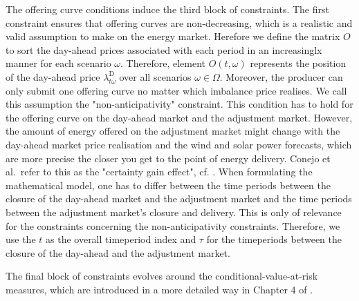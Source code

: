 The offering curve conditions induce the third block of constraints. The first constraint ensures that offering curves are non-decreasing, which is a realistic and valid assumption to make on the energy market. Herefore we define the matrix $O$ to sort the day-ahead prices associated with each period in an increasinglx manner for each scenario $\omega .$ Therefore, element $O(t, \omega)$ represents the position of the day-ahead price $\lambda_{t \omega}^{\mathrm{D}}$ over all scenarios $\omega \in \Omega$. 
Moreover, the producer can only submit one offering curve no matter which imbalance price realises. We call this assumption the "non-anticipativity" constraint. This condition has to hold for the offering curve on the day-ahead market and the adjustment market. However, the amount of energy offered on the adjustment market might change with the day-ahead market price realisation and the wind and solar power forecasts, which are more precise the closer you get to the point of energy delivery. Conejo et al.\ refer to this as the "certainty gain effect", cf. \cite{Conejo10}. When formulating the mathematical model, one has to differ between the
time periods between the closure of the day-ahead market and the adjustment market and
the time periods between the adjustment market's closure and delivery.  This is only of relevance for the constraints concerning the non-anticipativity constraints. Therefore, we use the $t$ as the overall timeperiod index and $\tau$ for the timeperiods between the closure of the day-ahead and the adjustment market.

The final block of constraints evolves around the conditional-value-at-risk measures, which are introduced in a more detailed way in Chapter 4 of \cite{Conejo10}.

